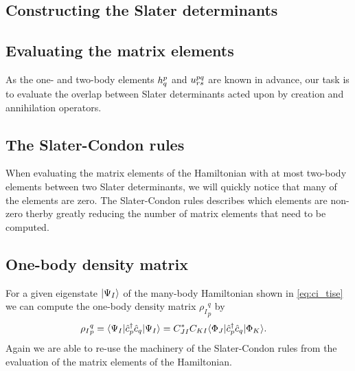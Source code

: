         \subsection{Constructing the Slater determinants}

        \subsection{Evaluating the matrix elements}
            As the one- and two-body elements $h^{p}_{q}$ and
            $u^{pq}_{rs}$ are known in advance, our task is to evaluate
            the overlap between Slater determinants acted upon by creation and
            annihilation operators.

        \subsection{The Slater-Condon rules}
            When evaluating the matrix elements of the Hamiltonian with at most
            two-body elements between two Slater determinants, we will quickly
            notice that many of the elements are zero.
            The Slater-Condon rules describes which elements are non-zero therby
            greatly reducing the number of matrix elements that need to be
            computed.

        \subsection{One-body density matrix}
            For a given eigenstate $| \Psi_I \rangle$ of the many-body Hamiltonian
            shown in \autoref{eq:ci_tise} we can compute the one-body density
            matrix ${\rho_I}^{q}_{p}$ by
            \begin{align}
                {\rho_I}^{q}_{p}
                &= \langle \Psi_I |\hat{c}_{p}^{\dagger}\hat{c}_{q}| \Psi_I \rangle
                = C_{JI}^{*}C_{KI}\langle \Phi_J |\hat{c}_{p}^{\dagger}\hat{c}_{q}| \Phi_K \rangle.
            \end{align}
            Again we are able to re-use the machinery of the Slater-Condon rules
            from the evaluation of the matrix elements of the Hamiltonian.


